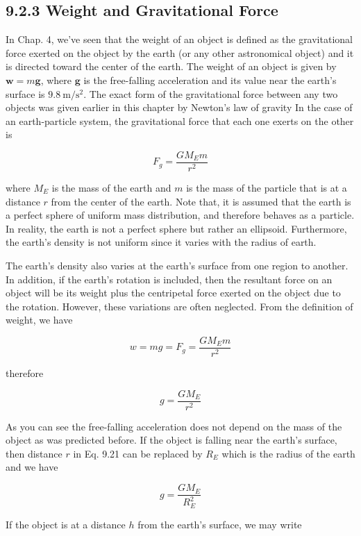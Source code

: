 \documentclass[10pt]{article}
\begin{document}
\subsection*{9.2.3 Weight and Gravitational Force}
In Chap. 4, we've seen that the weight of an object is defined as the gravitational force exerted on the object by the earth (or any other astronomical object) and it is directed toward the center of the earth. The weight of an object is given by $\mathbf{w}=m \mathbf{g}$, where $\mathbf{g}$ is the free-falling acceleration and its value near the earth's surface is $9.8 \mathrm{~m} / \mathrm{s}^{2}$. The exact form of the gravitational force between any two objects was given earlier in this chapter by Newton's law of gravity In the case of an earth-particle system, the gravitational force that each one exerts on the other is

$$
F_{g}=\frac{G M_{E} m}{r^{2}}
$$

where $M_{E}$ is the mass of the earth and $m$ is the mass of the particle that is at a distance $r$ from the center of the earth. Note that, it is assumed that the earth is a perfect sphere of uniform mass distribution, and therefore behaves as a particle. In reality, the earth is not a perfect sphere but rather an ellipsoid. Furthermore, the earth's density is not uniform since it varies with the radius of earth.

The earth's density also varies at the earth's surface from one region to another. In addition, if the earth's rotation is included, then the resultant force on an object will be its weight plus the centripetal force exerted on the object due to the rotation. However, these variations are often neglected. From the definition of weight, we have

$$
w=m g=F_{g}=\frac{G M_{E} m}{r^{2}}
$$

therefore


\begin{equation*}
g=\frac{G M_{E}}{r^{2}} \tag{9.21}
\end{equation*}


As you can see the free-falling acceleration does not depend on the mass of the object as was predicted before. If the object is falling near the earth's surface, then distance $r$ in Eq. 9.21 can be replaced by $R_{E}$ which is the radius of the earth and we have

$$
g=\frac{G M_{E}}{R_{E}^{2}}
$$

If the object is at a distance $h$ from the earth's surface, we may write
\end{document}
